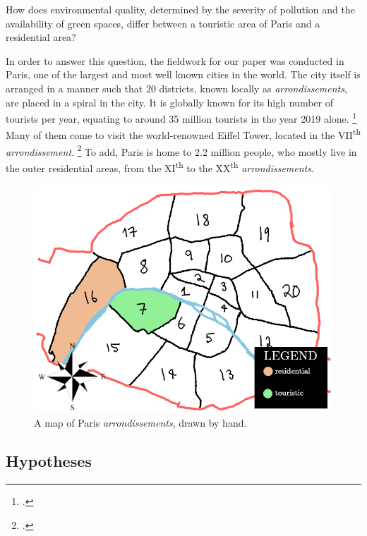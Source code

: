 \documentclass[11pt,letterpaper]{article}
\begin{document}
How does environmental quality, determined by the severity of pollution and the availability of green spaces, differ between a touristic area of Paris and a residential area?

In order to answer this question, the fieldwork for our paper was conducted in Paris, one of the largest and most well known cities in the world. The city itself is arranged in a manner such that 20 districts, known locally as \textit{arrondissements}, are placed in a spiral in the city. It is globally known for its high number of tourists per year, equating to around 35 million tourists in the year 2019 alone. \footcite{statista_department_27_2020} Many of them come to visit the world-renowned Eiffel Tower, located in the VII\textsuperscript{th} \textit{arrondissement}. \footcite{condor_ferries} To add, Paris is home to 2.2 million people, who mostly live in the outer residential areas, from the XI\textsuperscript{th} to the XX\textsuperscript{th} \textit{arrondissements}.

\begin{figure}[h!]
    \centering
    \includegraphics[width=0.7\linewidth]{media/arrts.png}
    \caption{A map of Paris \textit{arrondissements}, drawn by hand.}
\end{figure}



\subsection{Hypotheses}
\end{document}
